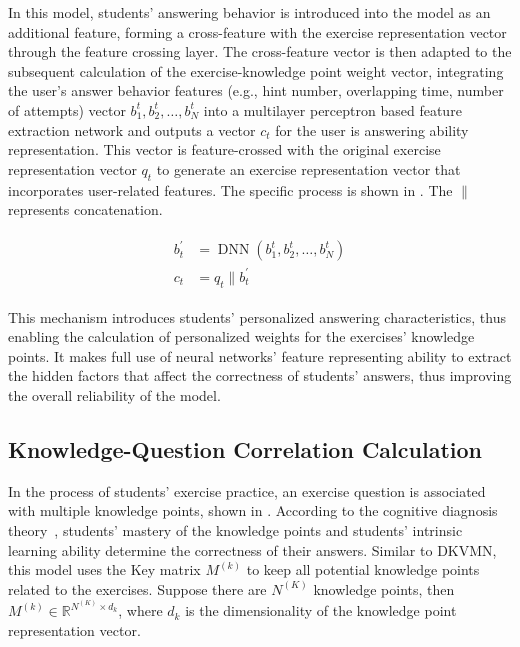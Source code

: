 In this model, students' answering behavior is introduced into the model as an additional feature, forming a cross-feature with the exercise representation vector through the feature crossing layer. The cross-feature vector is then adapted to the subsequent calculation of the exercise-knowledge point weight vector, integrating the user's answer behavior features (e.g., hint number, overlapping time, number of attempts) vector \(b_1^t,b_2^t,\ldots,b_N^t\) into a multilayer perceptron based feature extraction network and outputs a vector \(c_t\) for the user is answering ability representation. This vector is feature-crossed with the original exercise representation vector \(q_t\) to generate an exercise representation vector that incorporates user-related features. The specific process is shown in \eqname{\ref{fml:ch3-sbcap}}. The \(\| \) represents concatenation.

\begin{align}\label{fml:ch3-sbcap}
    \begin{split}
        b^{\prime}_t &= \operatorname{DNN}(b_1^t,b_2^t,\ldots,b_N^t) \\
        c_t &= q_t\|b^{\prime}_t
    \end{split}
\end{align}

This mechanism introduces students' personalized answering characteristics, thus enabling the calculation of personalized weights for the exercises' knowledge points. It makes full use of neural networks' feature representing ability to extract the hidden factors that affect the correctness of students' answers, thus improving the overall reliability of the model.

\subsection{Knowledge-Question Correlation Calculation}

In the process of students' exercise practice, an exercise question is associated with multiple knowledge points, shown in \figname{\ref{fig:ch3-kq-relationgraph}}. According to the cognitive diagnosis theory~\cite{chiu2018cognitive}, students' mastery of the knowledge points and students' intrinsic learning ability determine the correctness of their answers. Similar to DKVMN, this model uses the Key matrix \(M^{(k)}\) to keep all potential knowledge points related to the exercises. Suppose there are \(N^{(K)}\) knowledge points, then \(M^{(k)}\in\mathbb{R}^{{N^{(K)}}\times d_k}\), where \(d_k\) is the dimensionality of the knowledge point representation vector.

